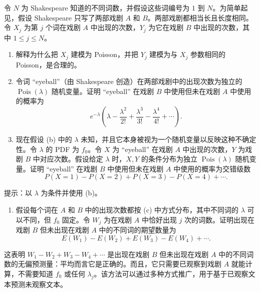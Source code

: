 \documentclass[UTF8,12pt,a4paper,fontset=fandol]{ctexart}
\begin{document}
令 $N$ 为 Shakespeare 知道的不同词数，并假设这些词编号为 $1$ 到 $N$。为简单起见，假设 Shakespeare 只写了两部戏剧 $A$ 和 $B$。两部戏剧都相当长且长度相同。令 $X_j$ 为第 $j$ 个词在戏剧 $A$ 中出现的次数，$Y_j$ 为它在戏剧 $B$ 中出现的次数，其中 $1\le j\le N$。
\begin{enumerate}
  \item[(a)] 解释为什么把 $X_j$ 建模为 Poisson，并把 $Y_j$ 建模为与 $X_j$ 参数相同的 Poisson，是合理的。
  \item[(b)] 令词 “eyeball”（由 Shakespeare 创造）在两部戏剧中的出现次数为独立的 $\operatorname{Pois}(\lambda)$ 随机变量。证明 “eyeball” 在戏剧 $B$ 中使用但未在戏剧 $A$ 中使用的概率为
  \[
    e^{-\lambda}\left(\lambda-\frac{\lambda^2}{2!}+\frac{\lambda^3}{3!}-\frac{\lambda^4}{4!}+\cdots\right).
  \]
  \item[(c)] 现在假设 (b) 中的 $\lambda$ 未知，并且它本身被视为一个随机变量以反映这种不确定性。令 $\lambda$ 的 PDF 为 $f_0$。令 $X$ 为 “eyeball” 在戏剧 $A$ 中出现的次数，$Y$ 为戏剧 $B$ 中对应次数。假设给定 $\lambda$ 时，$X,Y$ 的条件分布为独立 $\operatorname{Pois}(\lambda)$ 随机变量。证明 “eyeball” 在戏剧 $B$ 中使用但未在戏剧 $A$ 中使用的概率为交错级数
  \[
    P(X=1)-P(X=2)+P(X=3)-P(X=4)+\cdots.
  \]
\end{enumerate}
提示：以 $\lambda$ 为条件并使用 (b)。
\begin{enumerate}
  \item[(d)] 假设每个词在 $A$ 和 $B$ 中的出现次数都按 (c) 中方式分布，其中不同词的 $\lambda$ 可以不同，但 $f_0$ 固定。令 $W_j$ 为在戏剧 $A$ 中恰好出现 $j$ 次的词数。证明出现在戏剧 $B$ 但未出现在戏剧 $A$ 中的不同词的期望数量为
  \[
    E(W_1)-E(W_2)+E(W_3)-E(W_4)+\cdots.
  \]
\end{enumerate}
这表明 $W_1-W_2+W_3-W_4+\cdots$ 是出现在戏剧 $B$ 但未出现在戏剧 $A$ 中的不同词数的无偏预测量：平均而言它是正确的。而且，它只需要已观察到戏剧 $A$ 就能计算，不需要知道 $f_0$ 或任何 $\lambda_j$。该方法可以通过多种方式推广，用于基于已观察文本预测未观察文本。
\end{document}
